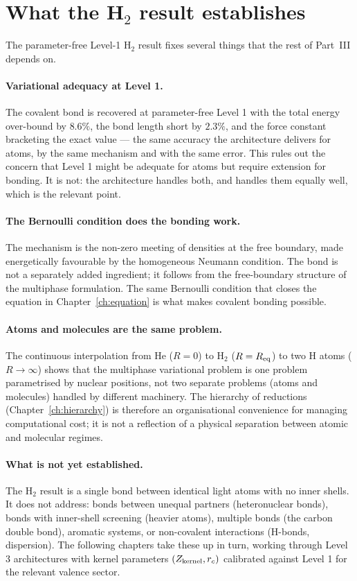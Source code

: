 \section{What the H$_2$ result establishes}\label{sec:h2-meaning}

The parameter-free Level-1 H$_2$ result fixes several things that the rest of Part~III depends on.

\paragraph{Variational adequacy at Level 1.} The covalent bond is recovered at parameter-free Level 1 with the total energy over-bound by $8.6\%$, the bond length short by $2.3\%$, and the force constant bracketing the exact value --- the same accuracy the architecture delivers for atoms, by the same mechanism and with the same error. This rules out the concern that Level 1 might be adequate for atoms but require extension for bonding. It is not: the architecture handles both, and handles them equally well, which is the relevant point.

\paragraph{The Bernoulli condition does the bonding work.} The mechanism is the non-zero meeting of densities at the free boundary, made energetically favourable by the homogeneous Neumann condition. The bond is not a separately added ingredient; it follows from the free-boundary structure of the multiphase formulation. The same Bernoulli condition that closes the equation in Chapter~\ref{ch:equation} is what makes covalent bonding possible.

\paragraph{Atoms and molecules are the same problem.} The continuous interpolation from He ($R = 0$) to H$_2$ ($R = R_{\rm eq}$) to two H atoms ($R \to \infty$) shows that the multiphase variational problem is one problem parametrised by nuclear positions, not two separate problems (atoms and molecules) handled by different machinery. The hierarchy of reductions (Chapter~\ref{ch:hierarchy}) is therefore an organisational convenience for managing computational cost; it is not a reflection of a physical separation between atomic and molecular regimes.

\paragraph{What is not yet established.} The H$_2$ result is a single bond between identical light atoms with no inner shells. It does not address: bonds between unequal partners (heteronuclear bonds), bonds with inner-shell screening (heavier atoms), multiple bonds (the carbon double bond), aromatic systems, or non-covalent interactions (H-bonds, dispersion). The following chapters take these up in turn, working through Level 3 architectures with kernel parameters $(Z_{\rm kernel}, r_c)$ calibrated against Level 1 for the relevant valence sector.

